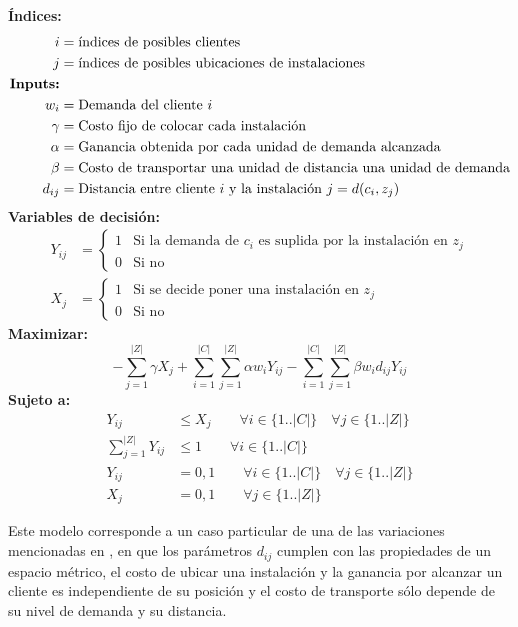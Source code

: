 \documentclass{article}
\begin{document}
\textbf{Índices:}
\begin{align*}
    i &= \text{índices de posibles clientes} \\
    j &= \text{índices de posibles ubicaciones de instalaciones} \\
    \text{\textbf{Inputs:}} \\
    w_i &= \text{Demanda del cliente $i$} \\
    \gamma &= \text{Costo fijo de colocar cada instalación} \\
    \alpha &= \text{Ganancia obtenida por cada unidad de demanda alcanzada} \\
    \beta &= \text{Costo de transportar una unidad de distancia una unidad de demanda} \\
    d_{ij} &= \text{Distancia entre cliente $i$ y la instalación $j$} = d(c_i,z_j)
\end{align*}
\textbf{Variables de decisión:}
\begin{align*}
    Y_{ij} &= \begin{cases}
        1 & \text{Si la demanda de $c_i$ es suplida por la instalación en $z_j$} \\
        0 & \text{Si no}
    \end{cases} \\
    X_{j} &= \begin{cases}
        1 & \text{Si se decide poner una instalación en $z_j$} \\
        0 & \text{Si no}
    \end{cases}
\end{align*}
\textbf{Maximizar:}
\begin{equation}
    - \sum_{j=1}^{|Z|} \gamma X_{j} + \sum_{i=1}^{|C|} \sum_{j=1}^{|Z|} \alpha w_i Y_{ij} - \sum_{i=1}^{|C|} \sum_{j=1}^{|Z|} \beta w_i d_{ij} Y_{ij}
\end{equation}
\textbf{Sujeto a:}
\begin{align*}
    Y_{ij} &\leq X_{j} \qquad \forall i \in \{1..|C|\} \quad \forall j \in \{1..|Z|\} \\
    \sum_{j=1}^{|Z|} Y_{ij} &\leq 1 \qquad \forall i \in \{1..|C|\} \\
    Y_{ij} &= 0,1 \qquad \forall i \in \{1..|C|\} \quad \forall j \in \{1..|Z|\} \\
    X_{j} &= 0,1 \qquad \forall j \in \{1..|Z|\}
\end{align*}

Este modelo corresponde a un caso particular de una de las variaciones mencionadas en \cite{mukundan1991joint}, en que los parámetros $d_{ij}$ cumplen con las propiedades de un espacio métrico, el costo de ubicar una instalación y la ganancia por alcanzar un cliente es independiente de su posición y el costo de transporte sólo depende de su nivel de demanda y su distancia.
\end{document}
